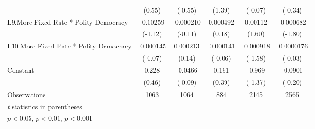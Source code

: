 {\begin{longtable}{l*{5}{c}}
                &   (0.55)         &  (-0.55)         &   (1.39)         &  (-0.07)         &  (-0.34)         \\
[1em]
L9.More Fixed Rate * Polity Democracy& -0.00259         &-0.000210         & 0.000492         &  0.00112         &-0.000682         \\
                &  (-1.12)         &  (-0.11)         &   (0.18)         &   (1.60)         &  (-1.80)         \\
[1em]
L10.More Fixed Rate * Polity Democracy&-0.000145         & 0.000213         &-0.000141         &-0.000918         &-0.0000176         \\
                &  (-0.07)         &   (0.14)         &  (-0.06)         &  (-1.58)         &  (-0.03)         \\
[1em]
Constant        &    0.228         &  -0.0466         &    0.191         &   -0.969         &  -0.0901         \\
                &   (0.46)         &  (-0.09)         &   (0.39)         &  (-1.37)         &  (-0.20)         \\
\hline
Observations    &     1063         &     1064         &      884         &     2145         &     2565         \\
\hline\hline
\multicolumn{6}{l}{\footnotesize \textit{t} statistics in parentheses}\\
\multicolumn{6}{l}{\footnotesize \sym{*} \(p<0.05\), \sym{**} \(p<0.01\), \sym{***} \(p<0.001\)}\\
\end{longtable}
}
